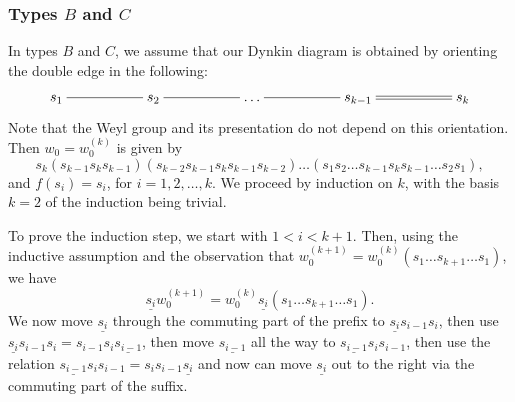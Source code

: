 \documentclass[a4paper]{amsart}
\begin{document}
\subsubsection{\bf Types $B$  and $C$}\label{s5.2.2}

In types $B$ and $C$, we assume that our Dynkin diagram is
obtained by orienting the double edge in the following:
\begin{displaymath}
\xymatrix{s_1\ar@{-}[rr]&&s_2\ar@{-}[rr]&&\dots\ar@{-}[rr]&&
s_{k-1}\ar@{=}[rr]&&s_k} 
\end{displaymath}
Note that the Weyl group and its presentation
do not depend on this orientation.
Then $w_0=w_0^{(k)}$ is given by 
\begin{displaymath}
s_k(s_{k-1}s_ks_{k-1})
(s_{k-2}s_{k-1}s_ks_{k-1}s_{k-2})\dots (s_1s_2\dots 
s_{k-1}s_ks_{k-1}\dots s_2s_1), 
\end{displaymath}
and $f(s_i)=s_{i}$, for $i=1,2,\dots,k$. We proceed by induction 
on $k$, with the basis $k=2$ of the induction being trivial.

To prove the induction step, we start with $1<i<k+1$. Then, using the
inductive assumption and the observation that 
$w_0^{(k+1)}=w_0^{(k)}(s_1\dots s_{k+1}\dots s_1)$, we have
\begin{displaymath}
\underline{s_i}w_0^{(k+1)}=
w_0^{(k)}\underline{s_i}(s_1\dots s_{k+1}\dots s_1).
\end{displaymath}
We now move $\underline{s_i}$ through the commuting part of the prefix
to $\underline{s_i}s_{i-1}s_i$, then use
$\underline{s_i}s_{i-1}s_i=s_{i-1}s_i\underline{s_{i-1}}$, then move
$\underline{s_{i-1}}$ all the way to 
$\underline{s_{i-1}}s_is_{i-1}$, then use the relation
$\underline{s_{i-1}}s_is_{i-1}=s_is_{i-1}\underline{s_i}$ and now can
move $\underline{s_i}$ out to the right via the commuting part of the suffix.
\end{document}
